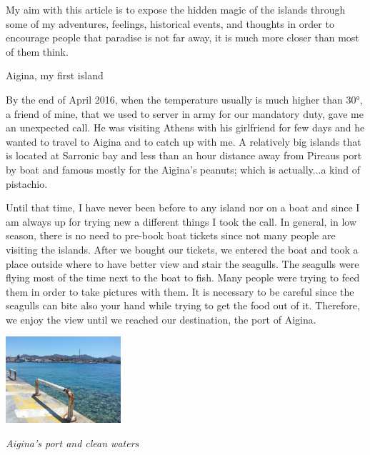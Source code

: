 \documentclass[10pt,a4paper]{article} %
\newcommand{\NewsItem}[1]{ %
\usefont{T1}{fvs}{n}{n} %
\vspace{24pt}\large #1\vspace{3pt} %
\par \normalsize \normalfont}
\begin{document}
\begin{multicols}{3}
My aim with this article is to expose the hidden magic of the islands through 
some of my adventures, feelings, historical events, and thoughts in order to encourage people that 
paradise is not far away, it is much more closer than most of them think. 
  

\NewsItem{Aigina, my first island}

By the end of April 2016, when the temperature usually is much higher than \ang{30}, 
a friend of mine, that we used to server in army for our mandatory duty, gave me 
an unexpected call. 
He was visiting Athens with his girlfriend for few days and he wanted to travel to 
Aigina and to catch up with me.
A relatively big islands that is located at Sarronic bay and less than an hour 
distance away from Pireaus port by boat and famous mostly for the Aigina's peanuts; 
which is actually...a kind of pistachio. 


Until that time, I have never been before to any island nor on a boat and since 
I am always up for trying new a different things I took the call. 
In general, in low season, there is no need to pre-book boat tickets since not 
many people are visiting the islands. 
After we bought our tickets, we entered the boat and took a place outside where 
to have better view and stair the seagulls. 
The seagulls were flying most of the time next to the boat to fish. 
Many people were trying to feed them in order to take pictures with them. 
It is necessary to be careful since the seagulls can bite also your hand while 
trying to get the food out of it. 
Therefore, we enjoy the view until we reached our destination, the port of Aigina. 


\begin{center}
	\includegraphics[width=0.32\textwidth]{media/aigina_2.jpg}
	\par\textit{Aigina's port and clean waters}
\end{center}



\end{multicols}
\end{document}
